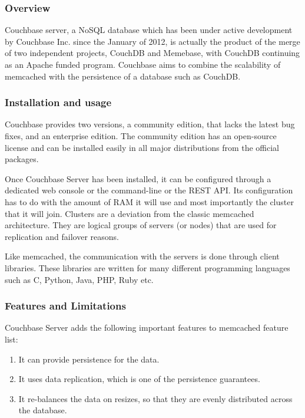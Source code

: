 \subsubsection{Overview}

Couchbase server, a NoSQL database which has been under active development by 
Couchbase Inc.  since the January of 2012, is actually the product of the merge 
of two independent projects, CouchDB and Memebase, with CouchDB continuing as 
an Apache funded program.  Couchbase aims to combine the scalability of 
memcached with the persistence of a database such as CouchDB. 

\subsubsection{Installation and usage}

Couchbase provides two versions, a community edition, that lacks the latest bug 
fixes, and an enterprise edition. The community edition has an open-source 
license and can be installed easily in all major distributions from the 
official packages.

Once Couchbase Server has been installed, it can be configured through a 
dedicated web console or the command-line or the REST API. Its configuration 
has to do with the amount of RAM it will use and most importantly the cluster 
that it will join. Clusters are a deviation from the classic memcached 
architecture. They are logical groups of servers (or nodes) that are used for 
replication and failover reasons.

Like memcached, the communication with the servers is done through client 
libraries. These libraries are written for many different programming languages 
such as C, Python, Java, PHP, Ruby etc.

\subsubsection{Features and Limitations}

Couchbase Server adds the following important features to memcached feature 
list:

\begin{enumerate}
	\item It can provide persistence for the data.
	\item It uses data replication, which is one of the persistence guarantees.  
	\item It re-balances the data on resizes, so that they are evenly 
		distributed across the database.
\end{enumerate}

